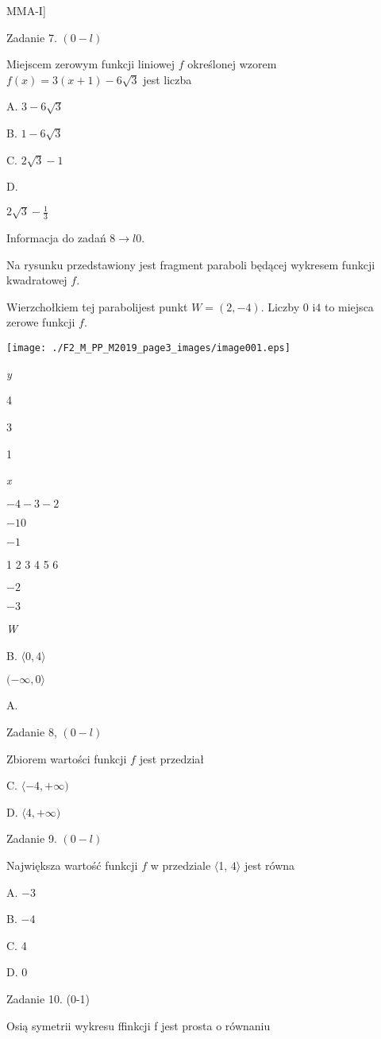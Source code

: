 \documentclass[a4paper,12pt]{article}
\begin{document}
MMA-I]





Zadanie 7. $(0-l)$

Miejscem zerowym funkcji liniowej $f$ określonej wzorem $f(x)=3(x+1)-6\sqrt{3}$ jest liczba

A. $3-6\sqrt{3}$

B. $1-6\sqrt{3}$

C. $2\sqrt{3}-1$

D.

$2\displaystyle \sqrt{3}-\frac{1}{3}$

Informacja do zadań $8\rightarrow l0.$

Na rysunku przedstawiony jest fragment paraboli będącej wykresem funkcji kwadratowej $f.$

Wierzchołkiem tej parabolijest punkt $W=(2,-4)$. Liczby 0 $\mathrm{i}4$ to miejsca zerowe funkcji $f.$
\begin{center}
\texttt{[image: ./F2\_M\_PP\_M2019\_page3\_images/image001.eps]}
\end{center}
{\it y}

4

3

1

{\it x}

$-4 -3  -2$

$-1 0$

$-1$

1 2 3 4  5 6

$-2$

$-3$

{\it W}

B. $\langle 0,  4\rangle$

$(-\infty,  0\rangle$

A.

Zadanie 8, $(0-l)$

Zbiorem wartości funkcji $f$ jest przedział

C. $\langle-4, +\infty)$

D. $\langle 4, +\infty)$

Zadanie 9. $(0-l)$

Największa wartość funkcji $f$ w przedziale $\langle$1, $ 4\rangle$ jest równa

A. $-3$

B. $-4$

C. 4

D. 0

Zadanie 10. (0-1)

Osią symetrii wykresu ffinkcji f jest prosta o równaniu
\end{document}
